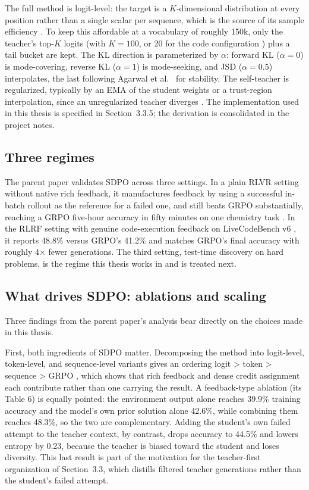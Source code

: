 The full method is logit-level: the target is a \(K\)-dimensional distribution at every position rather than a single scalar per sequence, which is the source of its sample efficiency \cite{r1}. To keep this affordable at a vocabulary of roughly 150k, only the teacher's top-\(K\) logits (with \(K{=}100\), or 20 for the code configuration \cite{r4}) plus a tail bucket are kept. The KL direction is parameterized by \(\alpha\): forward KL (\(\alpha{=}0\)) is mode-covering, reverse KL (\(\alpha{=}1\)) is mode-seeking, and JSD (\(\alpha{=}0.5\)) interpolates, the last following Agarwal et al.~\cite{r11} for stability. The self-teacher is regularized, typically by an EMA of the student weights or a trust-region interpolation, since an unregularized teacher diverges \cite{r1}. The implementation used in this thesis is specified in Section~3.3.5; the derivation is consolidated in the project notes.

\subsection{Three regimes}\label{three-regimes}

The parent paper validates SDPO across three settings. In a plain RLVR setting without native rich feedback, it manufactures feedback by using a successful in-batch rollout as the reference for a failed one, and still beats GRPO substantially, reaching a GRPO five-hour accuracy in fifty minutes on one chemistry task \cite{r1}. In the RLRF setting with genuine code-execution feedback on LiveCodeBench v6 \cite{r6}, it reports 48.8\% versus GRPO's 41.2\% and matches GRPO's final accuracy with roughly 4× fewer generations. The third setting, test-time discovery on hard problems, is the regime this thesis works in and is treated next.

\subsection{What drives SDPO: ablations and scaling}\label{what-drives-sdpo-ablations-and-scaling}

Three findings from the parent paper's analysis bear directly on the choices made in this thesis.

First, both ingredients of SDPO matter. Decomposing the method into logit-level, token-level, and sequence-level variants gives an ordering logit \textgreater{} token \textgreater{} sequence \textgreater{} GRPO \cite{r1}, which shows that rich feedback and dense credit assignment each contribute rather than one carrying the result. A feedback-type ablation (its Table 6) is equally pointed: the environment output alone reaches 39.9\% training accuracy and the model's own prior solution alone 42.6\%, while combining them reaches 48.3\%, so the two are complementary. Adding the student's own failed attempt to the teacher context, by contrast, drops accuracy to 44.5\% and lowers entropy by 0.23, because the teacher is biased toward the student and loses diversity. This last result is part of the motivation for the teacher-first organization of Section~3.3, which distills filtered teacher generations rather than the student's failed attempt.

